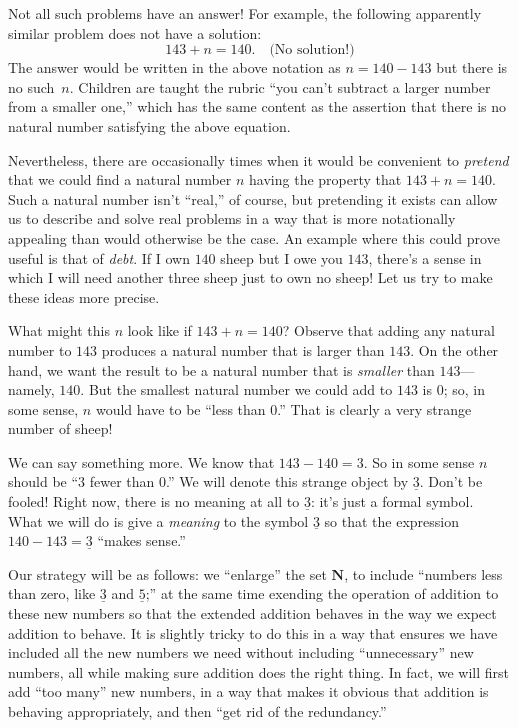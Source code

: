 \documentclass[10pt, a4paper, twocolumn]{article}
\newcommand{\set}[1]{\mathbold{#1}}
\newcommand{\N}{\set{N}}
\newcommand{\minus}[1]{\underline{#1}}
\begin{document}
Not all such problems have an answer! For example, the following
apparently similar problem does not have a solution:
\begin{equation*}
143 + n = 140. \quad\text{(No solution!)}
\end{equation*}
The answer would be written in the above notation as $n=140-143$ but there
is no such~$n$. Children are taught the rubric ``you can't
subtract a larger number from a smaller one,'' which has the same
content as the assertion that there is no natural number satisfying
the above equation.

Nevertheless, there are occasionally times when it would be convenient
to \emph{pretend} that we could find a natural number $n$ having the
property that $143+n=140$. Such a natural number isn't ``real,'' of
course, but pretending it exists can allow us to describe and solve
real problems in a way that is more notationally appealing than would
otherwise be the case. An example where this could prove useful is
that of \emph{debt}. If I own $140$ sheep but I owe you $143$, there's
a sense in which I will need another three sheep just to own no sheep!
Let us try to make these ideas more precise.

What might this $n$ look like if $143+n=140$? Observe that adding any natural
number to $143$ produces a natural number that is larger than
$143$. On the other hand, we want the result to be a natural number
that is \emph{smaller} than $143$---namely, $140$. But the smallest
natural number we could add to $143$ is $0$; so, in some sense, $n$
would have to be ``less than $0$.'' That is clearly a very strange
number of sheep!

We can say something more. We know that $143-140=3$. So in some sense
$n$ should be ``$3$ fewer than $0$.'' We will denote this strange
object by $\minus{3}$. Don't be fooled! Right now, there is no meaning
at all to $\minus{3}$: it's just a formal symbol. What we will do is
give a \emph{meaning} to the symbol $\minus{3}$ so that the expression
$140 - 143 = \minus{3}$ ``makes sense.''

Our strategy will be as follows: we ``enlarge'' the set $\N$, to
include ``numbers less than zero, like $\minus{3}$ and $\minus{5}$;''
at the same time exending the operation of addition to these new
numbers so that the extended addition behaves in the way we expect
addition to behave. It is slightly tricky to do this in a way that
ensures we have included all the new numbers we need without
including ``unnecessary'' new numbers, all while making sure addition
does the right thing. In fact, we will first add ``too many'' new
numbers, in a way that makes it obvious that addition is behaving
appropriately, and then ``get rid of the redundancy.''
\end{document}
